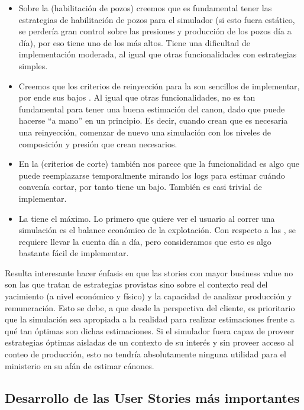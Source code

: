 \begin{itemize}
  \item Sobre la  (habilitación de pozos) creemos que es fundamental tener las estrategias de habilitación de pozos para el simulador (si esto fuera estático, se perdería gran control sobre las presiones y producción de los pozos día a día), por eso tiene uno de los \BV{} más altos. Tiene una dificultad de implementación moderada, al igual que otras funcionalidades con estrategias simples.

  \item Creemos que los criterios de reinyección para la  son sencillos de implementar, por ende sus bajos \SP{}. Al igual que otras funcionalidades, no es tan fundamental para tener una buena estimación del canon, dado que puede hacerse ``a mano'' en un principio. Es decir, cuando crean que es necesaria una reinyección, comenzar de nuevo una simulación con los niveles de composición y presión que crean necesarios.

  \item En la  (criterios de corte) también nos parece que la funcionalidad es algo que puede reemplazarse temporalmente mirando los logs para estimar cuándo convenía cortar, por tanto tiene un \BV{} bajo. También es casi trivial de implementar.

  \item La  tiene el \BV{} máximo. Lo primero que quiere ver el usuario al correr una simulación es el balance económico de la explotación. Con respecto a las \SP{}, se requiere llevar la cuenta día a día, pero consideramos que esto es algo bastante fácil de implementar.
\end{itemize}

Resulta interesante hacer énfasis en que las stories con mayor business value no son las que tratan de estrategias provistas sino sobre el contexto real del yacimiento (a nivel económico y físico) y la capacidad de analizar producción y remuneración. Esto se debe, a que desde la perspectiva del cliente, es prioritario que la simulación sea apropiada a la realidad para realizar estimaciones frente a qué tan óptimas son dichas estimaciones. Si el simulador fuera capaz de proveer estrategias óptimas aisladas de un contexto de su interés y sin proveer acceso al conteo de producción, esto no tendría absolutamente ninguna utilidad para el ministerio en su afán de estimar cánones.

\newpage
\subsection{Desarrollo de las User Stories más importantes}

